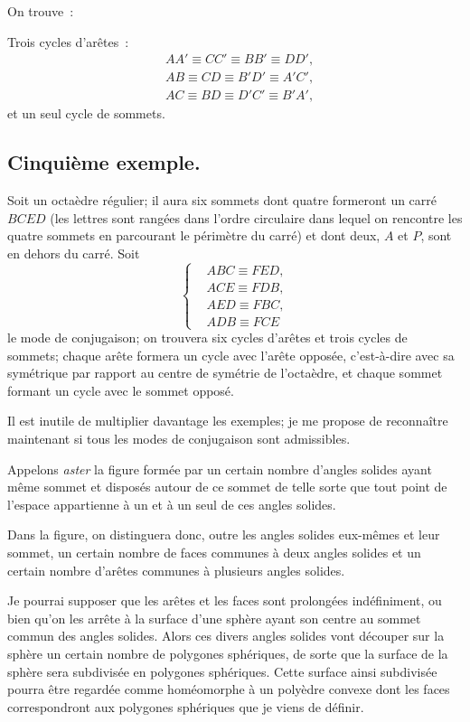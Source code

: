 \documentclass{article}
\begin{document}
On trouve~:

Trois cycles d'arêtes~:
\[ \begin{aligned} &AA' \equiv CC' \equiv BB' \equiv DD',\\ &AB \equiv CD \equiv B'D' \equiv A'C',\\ &AC \equiv BD \equiv D'C' \equiv B'A', \end{aligned} \]
et un seul cycle de sommets.

\subsection*{Cinquième exemple.}

Soit un octaèdre régulier; il aura six sommets dont quatre formeront un carré $BCED$ (les lettres sont rangées dans l'ordre circulaire dans lequel on rencontre les quatre sommets en parcourant le périmètre du carré) et dont deux, $A$ et $P$, sont en dehors du carré. Soit
\[ \left\{ \begin{aligned} &ABC \equiv FED,\\ &ACE \equiv FDB,\\ &AED \equiv FBC,\\ &ADB \equiv FCE \end{aligned} \right. \tag{6} \]
le mode de conjugaison; on trouvera six cycles d'arêtes et trois cycles de sommets; chaque arête formera un cycle avec l'arête opposée, c'est-à-dire avec sa symétrique par rapport au centre de symétrie de l'octaèdre, et chaque sommet formant un cycle avec le sommet opposé.

Il est inutile de multiplier davantage les exemples; je me propose de reconnaître maintenant si tous les modes de conjugaison sont admissibles.

Appelons \emph{aster} la figure formée par un certain nombre d'angles solides ayant même sommet et disposés autour de ce sommet de telle sorte que tout point de l'espace appartienne à un et à un seul de ces angles solides.

Dans la figure, on distinguera donc, outre les angles solides eux-mêmes et leur sommet, un certain nombre de faces communes à deux angles solides et un certain nombre d'arêtes communes à plusieurs angles solides.

Je pourrai supposer que les arêtes et les faces sont prolongées indéfiniment, ou bien qu'on les arrête à la surface d'une sphère ayant son centre au sommet commun des angles solides. Alors ces divers angles solides vont découper sur la sphère un certain nombre de polygones sphériques, de sorte que la surface de la sphère sera subdivisée en polygones sphériques. Cette surface ainsi subdivisée pourra être regardée comme homéomorphe à un polyèdre convexe dont les faces correspondront aux polygones sphériques que je viens de définir.
\end{document}
